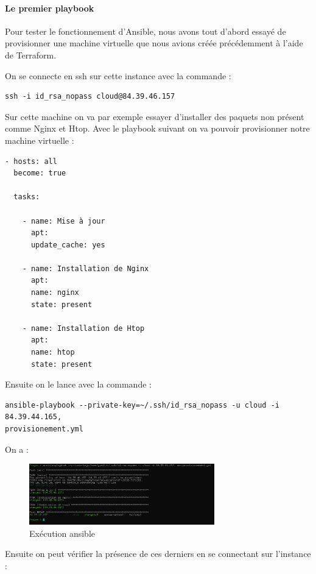 \documentclass[]{article}
\let\oldparagraph\paragraph
\renewcommand{\paragraph}[1]{\oldparagraph{#1}\mbox{}}
\begin{document}
\paragraph{Le premier playbook}\label{le-premier-playbook}

Pour tester le fonctionnement d'Ansible, nous avons tout d'abord essayé
de provisionner une machine virtuelle que nous avions créée précédemment
à l'aide de Terraform. 


On se connecte en ssh sur cette instance avec la commande :

\begin{verbatim}
ssh -i id_rsa_nopass cloud@84.39.46.157
\end{verbatim}

Sur cette machine on va par exemple essayer d'installer des paquets non
présent comme Nginx et Htop. Avec le playbook suivant on va pouvoir
provisionner notre machine virtuelle :

\begin{verbatim}
- hosts: all
  become: true

  tasks:

    - name: Mise à jour 
      apt:
      update_cache: yes

    - name: Installation de Nginx
      apt:
      name: nginx
      state: present

    - name: Installation de Htop
      apt:
      name: htop
      state: present
\end{verbatim}

Ensuite on le lance avec la commande :

\begin{verbatim}
ansible-playbook --private-key=~/.ssh/id_rsa_nopass -u cloud -i 84.39.44.165, 
provisionement.yml
\end{verbatim}

On a :

\begin{figure}
\centering
\includegraphics[height=100px]{Images/application.png}
\caption{Exécution ansible}
\end{figure}

Ensuite on peut vérifier la présence de ces derniers en se connectant
sur l'instance :
\end{document}
